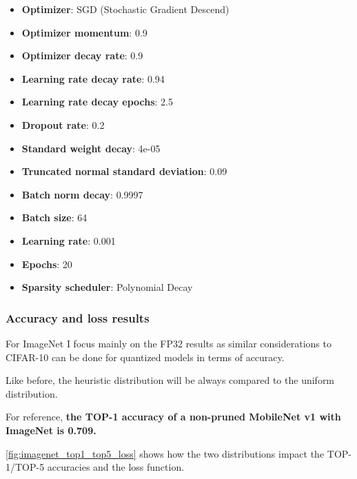 \begin{itemize}
    \item \textbf{Optimizer}: SGD (Stochastic Gradient Descend)
    \item \textbf{Optimizer momentum}: 0.9
    \item \textbf{Optimizer decay rate}: 0.9
    \item \textbf{Learning rate decay rate}: 0.94
    \item \textbf{Learning rate decay epochs}: 2.5
    \item \textbf{Dropout rate}: 0.2
    \item \textbf{Standard weight decay}: 4e-05
    \item \textbf{Truncated normal standard deviation}: 0.09
    \item \textbf{Batch norm decay}: 0.9997
    \item \textbf{Batch size}: 64
    \item \textbf{Learning rate}: 0.001
    \item \textbf{Epochs}: 20
    \item \textbf{Sparsity scheduler}: Polynomial Decay
\end{itemize}

\subsubsection{Accuracy and loss results}
For ImageNet I focus mainly on the FP32 results as similar considerations to
CIFAR-10 can be done for quantized models in terms of accuracy.

Like before, the heuristic distribution will be always compared to the uniform
distribution.

For reference, \textbf{the TOP-1 accuracy of a non-pruned MobileNet v1 with
ImageNet is 0.709.}

\autoref{fig:imagenet_top1_top5_loss} shows how the two distributions impact the
TOP-1/TOP-5 accuracies and the loss function.

